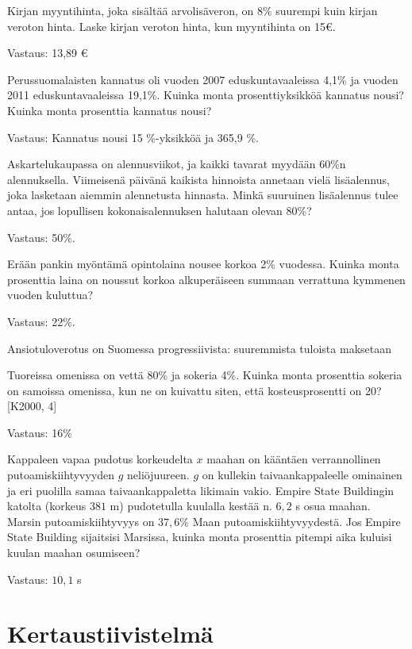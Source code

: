 \begin{tehtava}
Kirjan myyntihinta, joka sisältää arvolisäveron, on 8\% suurempi kuin kirjan veroton hinta. Laske kirjan veroton hinta, kun myyntihinta on 15\euro.
\begin{vastaus}
Vastaus: 13,89 \euro
\end{vastaus}
\end{tehtava}

\begin{tehtava}
Perussuomalaisten kannatus oli vuoden 2007 eduskuntavaaleissa 4,1\% ja vuoden 2011 eduskuntavaaleissa 19,1\%. Kuinka monta prosenttiyksikköä kannatus nousi? Kuinka monta prosenttia kannatus nousi?
\begin{vastaus}
Vastaus: Kannatus nousi 15 \%-yksikköä ja 365,9 \%.
\end{vastaus}
\end{tehtava}

\begin{tehtava}
Askartelukaupassa on alennusviikot, ja kaikki tavarat myydään 60\%n alennuksella. Viimeisenä päivänä kaikista hinnoista annetaan vielä lisäalennus, joka lasketaan aiemmin alennetusta hinnasta. Minkä suuruinen lisäalennus tulee antaa, jos lopullisen kokonaisalennuksen halutaan olevan 80\%?
\begin{vastaus}
Vastaus: 50\%.
\end{vastaus}
\end{tehtava}

\begin{tehtava}
Erään pankin myöntämä opintolaina nousee korkoa 2\% vuodessa. Kuinka monta prosenttia laina on noussut korkoa alkuperäiseen summaan verrattuna kymmenen vuoden kuluttua?
\begin{vastaus}
Vastaus: 22\%.
\end{vastaus}
\end{tehtava}

Ansiotuloverotus on Suomessa progressiivista: suuremmista tuloista maksetaan

\begin{tehtava}
Tuoreissa omenissa on vettä 80\% ja sokeria 4\%. Kuinka monta prosenttia sokeria on samoissa omenissa, kun ne on kuivattu siten, että kosteusprosentti on 20? [K2000, 4]
\begin{vastaus}
Vastaus: 16\%
\end{vastaus}
\end{tehtava}

\begin{tehtava}
Kappaleen vapaa pudotus korkeudelta $x$ maahan on kääntäen verrannollinen putoamiskiihtyvyyden $g$ neliöjuureen. $g$ on kullekin taivaankappaleelle ominainen ja eri puolilla samaa taivaankappaletta likimain vakio. Empire State Buildingin katolta (korkeus $381$ m) pudotetulla kuulalla kestää n. $6,2$ s osua maahan. Marsin putoamiskiihtyvyys on $37,6$\%  Maan putoamiskiihtyvyydestä. Jos Empire State Building sijaitsisi Marsissa, kuinka monta prosenttia pitempi aika kuluisi kuulan maahan osumiseen?
\begin{vastaus}
Vastaus: $10,1$ s
\end{vastaus}
\end{tehtava}

%
%
\chapter{Kertaustiivistelmä}
